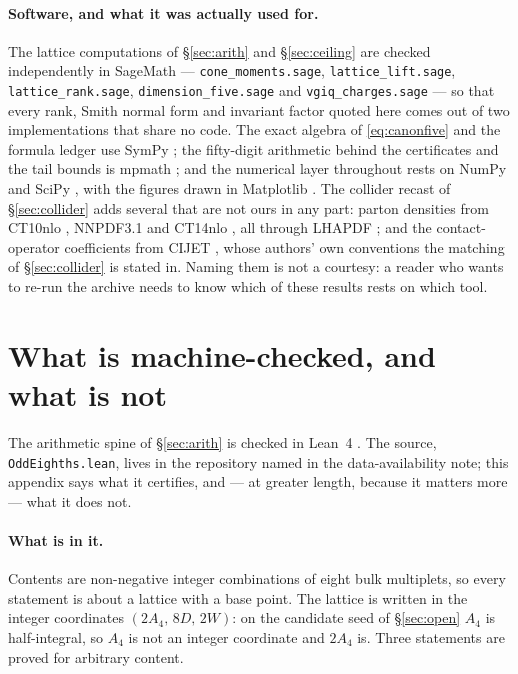 \documentclass[11pt,a4paper]{article}
\begin{document}
\paragraph{Software, and what it was actually used for.} The lattice computations of
\S\ref{sec:arith} and \S\ref{sec:ceiling} are checked independently in SageMath \cite{SageMath}
--- \texttt{cone\_\allowbreak moments.sage}, \texttt{lattice\_\allowbreak lift.sage},
\texttt{lattice\_\allowbreak rank.sage}, \texttt{dimension\_\allowbreak five.sage} and
\texttt{vgiq\_\allowbreak charges.sage} --- so that every rank, Smith normal form and invariant
factor quoted here comes out of two implementations that share no code. The exact algebra of
\eqref{eq:canonfive} and the formula ledger use SymPy \cite{SymPy}; the fifty-digit arithmetic
behind the certificates and the tail bounds is mpmath \cite{mpmath}; and the numerical layer
throughout rests on NumPy \cite{NumPy} and SciPy \cite{SciPy}, with the figures drawn in Matplotlib
\cite{Matplotlib}. The collider recast of \S\ref{sec:collider} adds several that are not
ours in any part: parton densities from CT10nlo \cite{CT10}, NNPDF3.1 \cite{NNPDF31} and CT14nlo
\cite{CT14}, all through LHAPDF \cite{LHAPDF}; and the
contact-operator coefficients from CIJET \cite{CIJET}, whose authors' own conventions the
matching of \S\ref{sec:collider} is stated in. Naming them is not a courtesy: a reader who wants to re-run the archive needs
to know which of these results rests on which tool.


\appendix
\section{What is machine-checked, and what is not}\label{app:lean}

The arithmetic spine of \S\ref{sec:arith} is checked in Lean~4 \cite{Lean4}. The source,
\texttt{OddEighths.lean}, lives in the repository named in the data-availability note; this appendix says
what it certifies, and --- at greater length, because it matters more --- what it does not.

\paragraph{What is in it.} Contents are non-negative integer combinations of eight bulk multiplets,
so every statement is about a lattice with a base point. The lattice is written in the integer
coordinates $(2A_4,\,8D,\,2W)$: on the candidate seed of \S\ref{sec:open} $A_4$ is half-integral, so
$A_4$ is not an integer coordinate and $2A_4$ is. Three statements are proved for arbitrary content.
\end{document}
